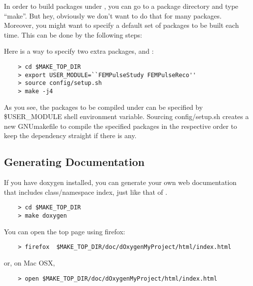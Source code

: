 In order to build packages under \UserDev, you can go to a package directory and type ``make''. But hey, obviously we don't want to do that for many packages. Moreover, you might want to specify a default set of packages to be built each time. This can be done by the following steps:

Here is a way to specify two extra packages, \FEMPulseStudy and \FEMPulseReco:
\begin{lstlisting}
    > cd $MAKE_TOP_DIR
    > export USER_MODULE=``FEMPulseStudy FEMPulseReco''
    > source config/setup.sh
    > make -j4
\end{lstlisting}
As you see, the packages to be compiled under \UserDev can be specified by {\ttfamily \$USER\_MODULE} shell environment variable.  Sourcing {\ttfamily config/setup.sh} creates a new GNUmakefile to compile the specified packages in the respective order to keep the dependency straight if there is any.


\subsection{Generating Documentation}
\label{sec:gendoxygen}
If you have {\ttfamily doxygen} installed, you can generate your own web documentation that includes \CPP class/namespace index, just like that of \ROOT.
\begin{lstlisting}
    > cd $MAKE_TOP_DIR
    > make doxygen
\end{lstlisting}
You can open the top page using firefox:
\begin{lstlisting}
    > firefox  $MAKE_TOP_DIR/doc/dOxygenMyProject/html/index.html
\end{lstlisting}
or, on Mac OSX,
\begin{lstlisting}
    > open $MAKE_TOP_DIR/doc/dOxygenMyProject/html/index.html
\end{lstlisting}


